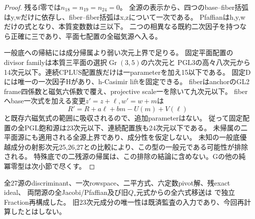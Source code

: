 \documentclass[a4paper,11pt]{ltjsarticle}
\theoremstyle{definition}
\begin{document}
\begin{proof}
残るf零では$n_{18}=n_{19}=n_{24}=0$。
全源の表示から、四つのbase--fiber括弧はy,wだけに依存し、fiber--fiber括弧はx,zについて一次である。
Pfaffianはh,y,wだけの式となり、本質変数数は三以下。
二つの相異なる既約二次因子を持つなら正確に三であり、平面七配置の全磁気源へ入る。

一般底への帰結には成分帰属より弱い次元上界で足りる。
固定平面配置のdivisor familyは本質三平面の選択$\operatorname{Gr}(3,5)$の六次元と
PGL3の高々八次元から14次元以下。連続CPLUS配置族だけは一parameterを加え15以下である。
固定Dには唯一の一次因子Hがあり、h-Casimir liftを固定できる。
fiberはanchorのGL2 frame四係数と磁気六係数で覆え、projective scale一を除いて九次元以下。
fiberへbase一次式を加える変更$z'=z+\ell,w'=w+m$は
\[
 R'=R+a\ell+bm-U(m)+V(\ell)
\]
と既存六磁気式の範囲に吸収されるので、追加parameterはない。
従って固定配置の全PGL飽和源は23次元以下、連続配置族も24次元以下である。
未帰属の二平面源にも適用される全源上界であり、成分性を仮定しない。
未知の一般底優越成分の射影次元25,26,27との比較により、この型の一般元である可能性が排除される。
特殊底での二残源の帰属は、この排除の結論に含めない。Gの他の純冪零型は次小節で尽くす。
\end{proof}
全27源のdiscriminant、一次rowspace、二平方式、六定数pivot解、残exact ideal、
両閉源の全Jacobi/Pfaffian及び旧$Q_*$元式からの全六式移送は
で独立Fraction再構成した。
旧23次元成分の唯一性は既済監査の入力であり、今回再計算したとはしない。
\end{document}
